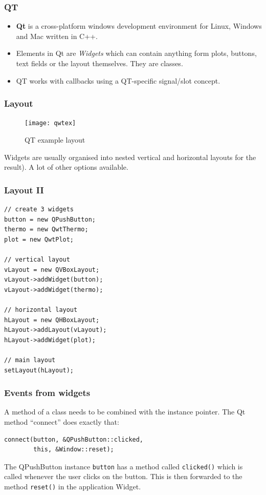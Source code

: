 \documentclass[xcolor=dvipsnames]{beamer}
\begin{document}
  

\begin{frame}[fragile]
  \frametitle{QT}

  \begin{itemize}
\item \textbf{Qt} is a cross-platform windows development environment for
Linux, Windows and Mac written in C++.

\item Elements in Qt are \textsl{Widgets} which can contain anything form
  plots, buttons, text fields or the layout themselves. They are classes.
  
\item QT works with callbacks using a QT-specific signal/slot concept.
\end{itemize}
\end{frame}
  



\begin{frame}[fragile]
  \frametitle{Layout}

\begin{figure}[!hbt]
\begin{center}
\mbox{\texttt{[image: qwtex]}}
\end{center}
\caption{QT example layout
\label{qwtex}}
\end{figure}

Widgets are usually organised into
nested vertical and horizontal layouts
for the result). A lot of other options available.
\end{frame}



\begin{frame}[fragile]
  \frametitle{Layout II}

\begin{verbatim}
// create 3 widgets
button = new QPushButton;
thermo = new QwtThermo; 
plot = new QwtPlot;

// vertical layout
vLayout = new QVBoxLayout;
vLayout->addWidget(button);
vLayout->addWidget(thermo);

// horizontal layout
hLayout = new QHBoxLayout;
hLayout->addLayout(vLayout);
hLayout->addWidget(plot);

// main layout
setLayout(hLayout);
\end{verbatim}
\end{frame}



\begin{frame}[fragile]
\frametitle{Events from widgets}
A method of a class needs to be combined with the instance
pointer. The Qt method ``connect'' does exactly that:
\begin{verbatim}
connect(button, &QPushButton::clicked,
        this, &Window::reset);
\end{verbatim}
The QPushButton instance \texttt{button}
has a method called \texttt{clicked()} which is
called whenever the user clicks on the button.
This is then forwarded to the
method \texttt{reset()} in the application Widget.
\end{frame}
\end{document}
